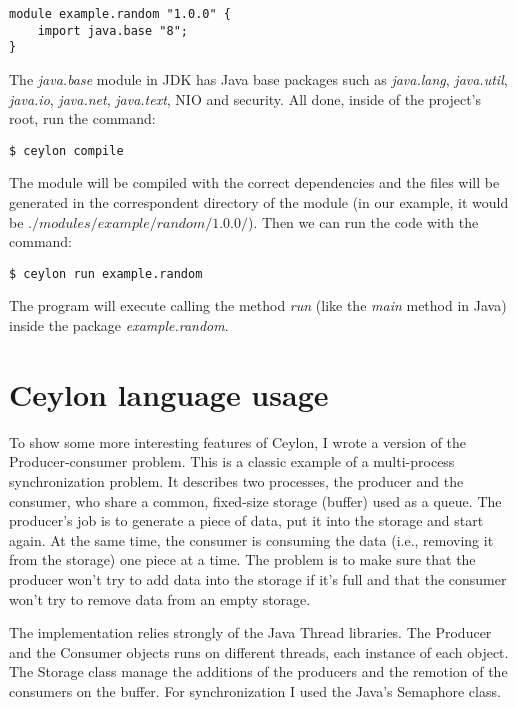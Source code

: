 \documentclass{abnt}
\begin{document}
\begin{lstlisting}
module example.random "1.0.0" {
    import java.base "8";
}
\end{lstlisting}

The \textit{java.base} module in JDK has Java base packages such as
\textit{java.lang}, \textit{java.util}, \textit{java.io}, \textit{java.net},
\textit {java.text}, NIO and security\cite{1_9}. All done, inside of the
project's root, run the command:

\begin{verbatim}
$ ceylon compile
\end{verbatim}

The module will be compiled with the correct dependencies and the files will be
generated in the correspondent directory of the module (in our example, it
would be $./modules/example/random/1.0.0/$). Then we can run the code
with the command:

\begin{verbatim}
$ ceylon run example.random
\end{verbatim}

The program will execute calling the method \textit{run} (like the \textit{main}
method in Java) inside the package \textit{example.random}.

\section{Ceylon language usage}

To show some more interesting features of Ceylon, I wrote a version of the
Producer-consumer problem. This is a classic example of a multi-process
synchronization problem. It describes two processes, the producer and the
consumer, who share a common, fixed-size storage (buffer) used as a queue. The
producer's job is to generate a piece of data, put it into the storage and start
again. At the same time, the consumer is consuming the data (i.e., removing it
from the storage) one piece at a time. The problem is to make sure that the
producer won't try to add data into the storage if it's full and that the
consumer won't try to remove data from an empty storage\cite{2_1}.

The implementation relies strongly of the Java Thread libraries. The Producer
and the Consumer objects runs on different threads, each instance of each
object. The Storage class manage the additions of the producers and the
remotion of the consumers on the buffer. For synchronization I used the Java's
Semaphore class.
\end{document}
